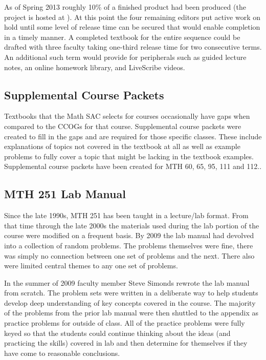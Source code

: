 As of Spring 2013 roughly 10\% of a finished product had been produced (the project is hosted at \cite{mth111project}).  At this point the four remaining editors put active work on hold until some level of release time can be secured that would enable completion in a timely manner.  A completed textbook for the entire sequence could be drafted with three faculty taking one-third release time for two consecutive terms.  An additional such term would provide for peripherals such as guided lecture notes, an online homework library, and LiveScribe videos. 
 
\subsection{Supplemental Course Packets}
Textbooks that the Math SAC selects for courses occasionally have gaps when compared to the CCOGs for that course.  Supplemental course packets were created to fill in the gaps and are required for those specific classes.  These include explanations of topics not covered in the textbook at all as well as example problems to fully cover a topic that might be lacking in the textbook examples.  Supplemental course packets have been created for MTH 60, 65, 95, 111 and 112..
 
\subsection{MTH 251 Lab Manual}
Since the late 1990s, MTH 251 has been taught in a lecture/lab format.  From that time through the late 2000s the materials used during the lab portion of the course were modified on a frequent basis.  By 2009 the lab manual had devolved into a collection of random problems.  The problems themselves were fine, there was simply no connection between one set of problems and the next.  There also were limited central themes to any one set of problems.

In the summer of 2009 faculty member Steve Simonds rewrote the lab manual from scratch.  The problem sets were written in a deliberate way to help students develop deep understanding of key concepts covered in the course.  The majority of the problems from the prior lab manual were then shuttled to the appendix as practice problems for outside of class.  All of the practice problems were fully keyed so that the students could continue thinking about the ideas (and practicing the skills) covered in lab and then determine for themselves if they have come to reasonable conclusions.

